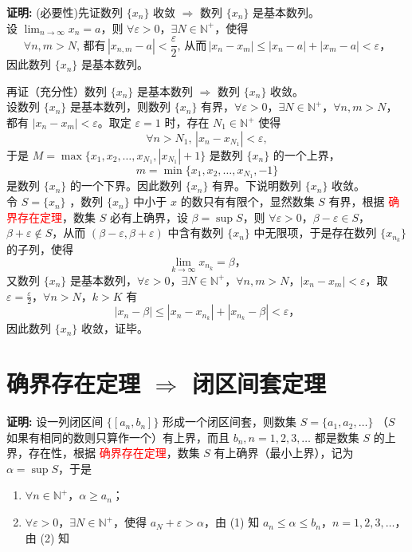 \documentclass[lang=cn,newtx,10pt,scheme=chinese]{elegantbook}
\begin{document}
\textbf{证明:} (必要性)先证数列 $\{x_n\}$ 收敛 $\Rightarrow$ 数列 $\{x_n\}$ 是基本数列。\\
设 $\lim_{n \to \infty} x_n = a$，则 $\forall \varepsilon > 0$，$\exists N \in \mathbb{N}^{+}$，使得
\[
\forall n, m > N, \, 都有 \, |x_{n,m} - a| < \frac{\varepsilon}{2}, \, 从而 \, |x_n - x_m| \leq |x_n - a| + |x_m - a| < \varepsilon，
\]
因此数列 $\{x_n\}$ 是基本数列。

再证（充分性）数列 $\{x_n\}$ 是基本数列 $\Rightarrow$ 数列 $\{x_n\}$ 收敛。\\
设数列 $\{x_n\}$ 是基本数列，则数列 $\{x_n\}$ 有界，$\forall \varepsilon > 0$，$\exists N \in \mathbb{N}^{+}$，$\forall n, m > N$，都有 $|x_n - x_m| < \varepsilon$。取定 $\varepsilon = 1$ 时，存在 $N_1 \in \mathbb{N}^{+}$ 使得
\[
\forall n > N_1, \, |x_n - x_{N_1}| < \varepsilon,
\]
于是 $M = \max\{x_1, x_2, \ldots, x_{N_1}, |x_{N_1}| + 1\}$ 是数列 $\{x_n\}$ 的一个上界，
\[
m = \min\{x_1, x_2, \ldots, x_{N_1}, -1\}
\]
是数列 $\{x_n\}$ 的一个下界。因此数列 $\{x_n\}$ 有界。下说明数列 $\{x_n\}$ 收敛。\\
令 $S = \{x_n\}$ ，数列 $\{x_n\}$ 中小于 $x$ 的数只有有限个，显然数集 $S$ 有界，根据 \textcolor{red}{确界存在定理}，数集 $S$ 必有上确界，设 $\beta = \sup S$，则 $\forall \varepsilon > 0$，$\beta - \varepsilon \in S$，$\beta + \varepsilon \notin S$，从而 $(\beta - \varepsilon, \beta + \varepsilon)$ 中含有数列 $\{x_n\}$ 中无限项，于是存在数列 $\{x_{n_k}\}$ 的子列，使得
\[
\lim_{k \to \infty} x_{n_k} = \beta，
\]
又数列 $\{x_n\}$ 是基本数列，$\forall \varepsilon > 0$，$\exists N \in \mathbb{N}^{+}$，$\forall n, m > N$，$|x_n - x_m| < \varepsilon$，取 $\varepsilon = \frac{\varepsilon}{2}$，$\forall n > N$，$k > K$ 有
\[
|x_n - \beta| \leq |x_n - x_{n_k}| + |x_{n_k} - \beta| < \varepsilon，
\]
因此数列 $\{x_n\}$ 收敛，证毕。


\section*{确界存在定理 $\Rightarrow$ 闭区间套定理}
\textbf{证明:} 设一列闭区间 $\{[a_n, b_n]\}$ 形成一个闭区间套，则数集 $S = \{a_1, a_2, \ldots\}$ （$S$ 如果有相同的数则只算作一个）有上界，而且 $b_n, n = 1, 2, 3, \ldots$ 都是数集 $S$ 的上界，存在性，根据 \textcolor{red}{确界存在定理}，数集 $S$ 有上确界（最小上界），记为 $\alpha = \sup S$，于是
\begin{enumerate}
    \item $\forall n \in \mathbb{N}^{+}$，$\alpha \geq a_n$；
    \item $\forall \varepsilon > 0$，$\exists N \in \mathbb{N}^{+}$，使得 $a_N + \varepsilon > \alpha$，由 (1) 知 $a_n \leq \alpha \leq b_n$，$n = 1, 2, 3, \ldots$，由 (2) 知
\end{enumerate}
\end{document}
